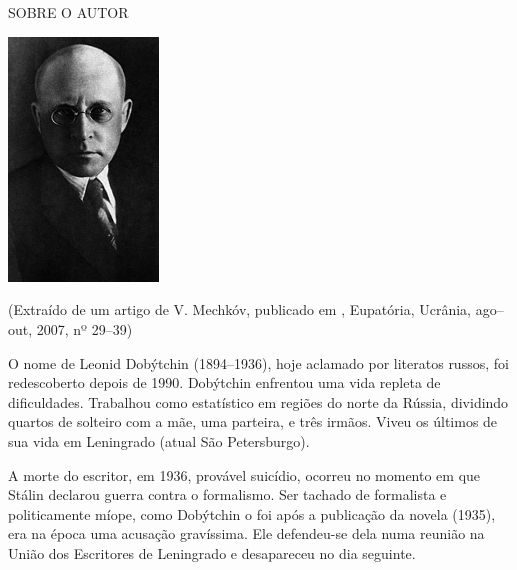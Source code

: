 \clearpage
\thispagestyle{empty}

\movetoevenpage
\small\MyriadPro\itshape
\label{colaboradores}

\noindent{}SOBRE O AUTOR\\

\begin{center}
\includegraphics[width=4cm]{./autor.jpg}
\end{center}

\epigraph{{}}{(Extraído de um artigo de V. Mechkóv, publicado em {}, Eupatória, Ucrânia, ago–out, 2007, nº 29–39)}

O nome de Leonid Dobýtchin (1894–1936), hoje aclamado por literatos
russos, foi redescoberto depois de 1990. Dobýtchin enfrentou uma vida
repleta de dificuldades. Trabalhou como estatístico em regiões do norte
da Rússia, dividindo quartos de solteiro com a mãe, uma parteira, e três
irmãos. Viveu os últimos de sua vida em Leningrado (atual São
Petersburgo).

A morte do escritor, em 1936, provável suicídio, ocorreu no momento em
que Stálin declarou guerra contra o formalismo. Ser tachado de
formalista e politicamente míope, como Dobýtchin o foi após a publicação
da novela {} (1935), era na época uma acusação
gravíssima. Ele defendeu-se dela numa reunião na União dos Escritores de
Leningrado e desapareceu no dia seguinte.

